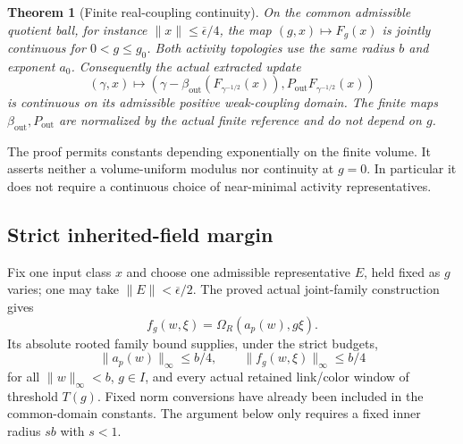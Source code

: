 \documentclass[11pt]{article}
\newtheorem{theorem}{Theorem}[section]
\theoremstyle{remark}
\begin{document}
\begin{theorem}[Finite real-coupling continuity]
\label{fqc-theorem}
On the common admissible quotient ball, for instance
$\lVert x\rVert\leq\overline\epsilon/4$, the map
$(g,x)\mapsto F_g(x)$ is jointly continuous for $0<g\leq g_0$.
Both activity topologies use the same radius $b$ and exponent $a_0$.
Consequently the actual extracted update
\begin{equation}
 (\gamma,x)\longmapsto
 \left(\gamma-\beta_{\mathrm{out}}
                 (F_{\gamma^{-1/2}}(x)),
       P_{\mathrm{out}}F_{\gamma^{-1/2}}(x)\right)
 \label{fqc-extracted-map}
\end{equation}
is continuous on its admissible positive weak-coupling domain.
The finite maps $\beta_{\mathrm{out}},P_{\mathrm{out}}$ are normalized
by the actual finite reference and do not depend on $g$.
\end{theorem}

The proof permits constants depending exponentially on the finite
volume. It asserts neither a volume-uniform modulus nor continuity
at $g=0$. In particular it does not require a continuous choice of
near-minimal activity representatives.

\subsection{Strict inherited-field margin}
\label{fqc-margin-section}

Fix one input class $x$ and choose one admissible representative
$E$, held fixed as $g$ varies; one may take
$\lVert E\rVert<\overline\epsilon/2$.
The proved actual joint-family construction gives
\begin{equation}
 f_g(w,\xi)=\Omega_R(a_p(w),g\xi).
 \label{fqc-actual-field}
\end{equation}
Its absolute rooted family bound supplies, under the strict budgets,
\begin{equation}
 \lVert a_p(w)\rVert_\infty\leq b/4,\qquad
 \lVert f_g(w,\xi)\rVert_\infty\leq b/4
 \label{fqc-margin}
\end{equation}
for all $\lVert w\rVert_\infty<b$, $g\in I$, and every actual
retained link/color window of threshold $T(g)$. Fixed norm
conversions have already been included in the common-domain
constants. The argument below only requires a fixed inner radius
$sb$ with $s<1$.
\end{document}
